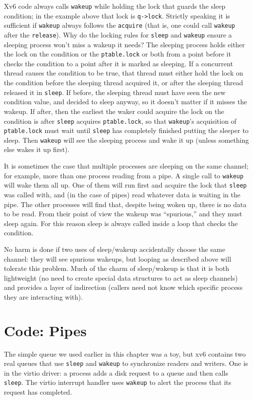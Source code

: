 Xv6 code always calls
\lstinline{wakeup}
while holding the lock that guards the sleep condition;
in the example above that lock is
\lstinline{q->lock}.
Strictly speaking it is sufficient if
\lstinline{wakeup}
always follows the
\lstinline{acquire}
(that is, one could call
\lstinline{wakeup}
after the
\lstinline{release}).
Why do the locking rules for 
\lstinline{sleep}
and
\lstinline{wakeup}
ensure a sleeping process won't miss a wakeup it needs?
The sleeping process holds either
the lock on the condition or the
\lstinline{ptable.lock} 
or both from a point before it checks the condition
to a point after it is marked as sleeping.
If a concurrent thread causes the condition to be true,
that thread must either hold the lock on the condition before the
sleeping thread acquired it, or after the sleeping
thread released it in
\lstinline{sleep}.
If before, the sleeping thread must have seen the new condition
value, and decided to sleep anyway, so it doesn't matter
if it misses the wakeup.
If after, then the earliest the waker could acquire the
lock on the condition is after
\lstinline{sleep}
acquires
\lstinline{ptable.lock},
so that
\lstinline{wakeup}'s
acquisition of
\lstinline{ptable.lock}
must wait until
\lstinline{sleep}
has completely finished putting the sleeper to sleep.
Then 
\lstinline{wakeup}
will see the sleeping process and wake it up
(unless something else wakes it up first).

It is sometimes the case that multiple processes are sleeping
on the same channel; for example, more than one process
reading from a pipe.
A single call to 
\lstinline{wakeup}
will wake them all up.
One of them will run first and acquire the lock that
\lstinline{sleep}
was called with, and (in the case of pipes) read whatever
data is waiting in the pipe.
The other processes will find that, despite being woken up,
there is no data to be read.
From their point of view the wakeup was ``spurious,'' and
they must sleep again.
For this reason sleep is always called inside a loop that
checks the condition.

No harm is done if two uses of sleep/wakeup accidentally
choose the same channel: they will see spurious wakeups,
but looping as described above will tolerate this problem.
Much of the charm of sleep/wakeup is that it is both
lightweight (no need to create special data
structures to act as sleep channels) and provides a layer
of indirection (callers need not know which specific process
they are interacting with).
\section{Code: Pipes}
The simple queue we used earlier in this chapter
was a toy, but xv6 contains two real queues
that use
\lstinline{sleep}
and
\lstinline{wakeup}
to synchronize readers and writers.
One is in the virtio driver: a process adds a disk request to a queue and then
calls
\lstinline{sleep}.
The virtio interrupt handler uses
\lstinline{wakeup}
to alert the process that its request has completed.

